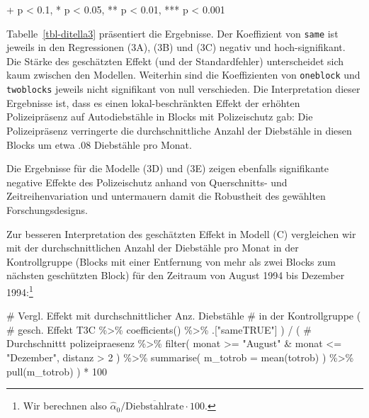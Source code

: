 \documentclass[
  a4paper,
  DIV=11,
  oneside]{scrreprt}
\newenvironment{Shaded}{\begin{snugshade}}{\end{snugshade}}
\newcommand{\AttributeTok}[1]{\textcolor[rgb]{0.40,0.45,0.13}{#1}}
\newcommand{\CommentTok}[1]{\textcolor[rgb]{0.37,0.37,0.37}{#1}}
\newcommand{\DecValTok}[1]{\textcolor[rgb]{0.68,0.00,0.00}{#1}}
\newcommand{\FunctionTok}[1]{\textcolor[rgb]{0.28,0.35,0.67}{#1}}
\newcommand{\NormalTok}[1]{\textcolor[rgb]{0.00,0.23,0.31}{#1}}
\newcommand{\SpecialCharTok}[1]{\textcolor[rgb]{0.37,0.37,0.37}{#1}}
\newcommand{\StringTok}[1]{\textcolor[rgb]{0.13,0.47,0.30}{#1}}
\begin{document}
\begin{minipage}{\linewidth}
+ p < 0.1, * p < 0.05, ** p < 0.01, *** p < 0.001\\
\end{minipage}
\endgroup

Tabelle~\ref{tbl-ditella3} präsentiert die Ergebnisse. Der Koeffizient
von \texttt{same} ist jeweils in den Regressionen (3A), (3B) und (3C)
negativ und hoch-signifikant. Die Stärke des geschätzten Effekt (und der
Standardfehler) unterscheidet sich kaum zwischen den Modellen. Weiterhin
sind die Koeffizienten von \texttt{oneblock} und \texttt{twoblocks}
jeweils nicht signifikant von null verschieden. Die Interpretation
dieser Ergebnisse ist, dass es einen lokal-beschränkten Effekt der
erhöhten Polizeipräsenz auf Autodiebstähle in Blocks mit Polizeischutz
gab: Die Polizeipräsenz verringerte die durchschnittliche Anzahl der
Diebstähle in diesen Blocks um etwa \(.08\) Diebstähle pro Monat.

Die Ergebnisse für die Modelle (3D) und (3E) zeigen ebenfalls
signifikante negative Effekte des Polizeischutz anhand von Querschnitts-
und Zeitreihenvariation und untermauern damit die Robustheit des
gewählten Forschungsdesigns.

Zur besseren Interpretation des geschätzten Effekt in Modell (C)
vergleichen wir mit der durchschnittlichen Anzahl der Diebstähle pro
Monat in der Kontrollgruppe (Blocks mit einer Entfernung von mehr als
zwei Blocks zum nächsten geschützten Block) für den Zeitraum von August
1994 bis Dezember 1994:\footnote{Wir berechnen also
  \(\widehat{\alpha}_0 / \overline{\text{Diebstahlrate}} \cdot 100\).}

\begin{Shaded}
\begin{Highlighting}[]
\CommentTok{\# Vergl. Effekt mit durchschnittlicher Anz. Diebstähle }
\CommentTok{\# in der Kontrollgruppe}
\NormalTok{( }
  \CommentTok{\# gesch. Effekt}
\NormalTok{  T3C }\SpecialCharTok{\%\textgreater{}\%} 
    \FunctionTok{coefficients}\NormalTok{() }\SpecialCharTok{\%\textgreater{}\%} 
\NormalTok{    .[}\StringTok{"sameTRUE"}\NormalTok{] }
\NormalTok{) }\SpecialCharTok{/} 
\NormalTok{  ( }\CommentTok{\# Durchschnittt}
\NormalTok{    polizeipraesenz }\SpecialCharTok{\%\textgreater{}\%} 
      \FunctionTok{filter}\NormalTok{(}
\NormalTok{        monat }\SpecialCharTok{\textgreater{}=} \StringTok{"August"} \SpecialCharTok{\&}\NormalTok{ monat }\SpecialCharTok{\textless{}=} \StringTok{"Dezember"}\NormalTok{,}
\NormalTok{        distanz }\SpecialCharTok{\textgreater{}} \DecValTok{2}
\NormalTok{      ) }\SpecialCharTok{\%\textgreater{}\%}
      \FunctionTok{summarise}\NormalTok{(}
        \AttributeTok{m\_totrob =} \FunctionTok{mean}\NormalTok{(totrob)}
\NormalTok{      ) }\SpecialCharTok{\%\textgreater{}\%} 
      \FunctionTok{pull}\NormalTok{(m\_totrob)}
\NormalTok{  ) }\SpecialCharTok{*} \DecValTok{100}
\end{Highlighting}
\end{Shaded}
\end{document}

